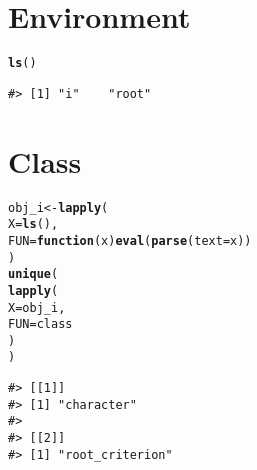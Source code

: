 \documentclass{article}\usepackage[]{graphicx}\usepackage[]{color}
\makeatletter
\newcommand{\hlstd}[1]{\textcolor[rgb]{0.345,0.345,0.345}{#1}}%
\newcommand{\hlkwa}[1]{\textcolor[rgb]{0.161,0.373,0.58}{\textbf{#1}}}%
\newcommand{\hlkwb}[1]{\textcolor[rgb]{0.69,0.353,0.396}{#1}}%
\newcommand{\hlkwc}[1]{\textcolor[rgb]{0.333,0.667,0.333}{#1}}%
\newcommand{\hlkwd}[1]{\textcolor[rgb]{0.737,0.353,0.396}{\textbf{#1}}}%
\newenvironment{kframe}{%
 \def\at@end@of@kframe{}%
 \ifinner\ifhmode%
  \def\at@end@of@kframe{\end{minipage}}%
  \begin{minipage}{\columnwidth}%
 \fi\fi%
 \def\FrameCommand##1{\hskip\@totalleftmargin \hskip-\fboxsep
 \colorbox{shadecolor}{##1}\hskip-\fboxsep
     \hskip-\linewidth \hskip-\@totalleftmargin \hskip\columnwidth}%
 \MakeFramed {\advance\hsize-\width
   \@totalleftmargin\z@ \linewidth\hsize
   \@setminipage}}%
 {\par\unskip\endMakeFramed%
 \at@end@of@kframe}
\newenvironment{knitrout}{}{} %
\makeatother
\begin{document}
\section*{Environment}

\begin{knitrout}
\color{fgcolor}\begin{kframe}
\begin{alltt}
\hlkwd{ls}\hlstd{()}
\end{alltt}
\begin{verbatim}
#> [1] "i"    "root"
\end{verbatim}
\end{kframe}
\end{knitrout}

\section*{Class}

\begin{knitrout}
\color{fgcolor}\begin{kframe}
\begin{alltt}
\hlstd{obj_i} \hlkwb{<-} \hlkwd{lapply}\hlstd{(}
  \hlkwc{X} \hlstd{=} \hlkwd{ls}\hlstd{(),}
  \hlkwc{FUN} \hlstd{=} \hlkwa{function}\hlstd{(}\hlkwc{x}\hlstd{)} \hlkwd{eval}\hlstd{(}\hlkwd{parse}\hlstd{(}\hlkwc{text} \hlstd{= x))}
\hlstd{)}
\hlkwd{unique}\hlstd{(}
  \hlkwd{lapply}\hlstd{(}
    \hlkwc{X} \hlstd{= obj_i,}
    \hlkwc{FUN} \hlstd{= class}
  \hlstd{)}
\hlstd{)}
\end{alltt}
\begin{verbatim}
#> [[1]]
#> [1] "character"
#> 
#> [[2]]
#> [1] "root_criterion"
\end{verbatim}
\end{kframe}
\end{knitrout}

\nocite{R-2021}

\printbibliography
\end{document}
